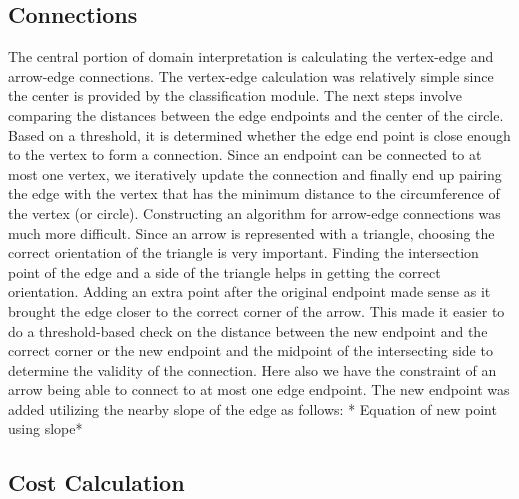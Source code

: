 \subsection{Connections}

The central portion of domain interpretation is calculating the vertex-edge and arrow-edge connections. The vertex-edge calculation was relatively simple since the center is provided by the classification module. The next steps involve comparing the distances between the edge endpoints and the center of the circle. Based on a threshold, it is determined whether the edge end point is close enough to the vertex to form a connection. Since an endpoint can be connected to at most one vertex, we iteratively update the connection and finally end up pairing the edge with the vertex that has the minimum distance to the circumference of the vertex (or circle). Constructing an algorithm for arrow-edge connections was much more difficult. Since an arrow is represented with a triangle, choosing the correct orientation of the triangle is very important. Finding the intersection point of the edge and a side of the triangle helps in getting the correct orientation. Adding an extra point after the original endpoint made sense as it brought the edge closer to the correct corner of the arrow. This made it easier to do a threshold-based check on the distance between the new endpoint and the correct corner or the new endpoint and the midpoint of the intersecting side to determine the validity of the connection. Here also we have the constraint of an arrow being able to connect to at most one edge endpoint. The new endpoint was added utilizing the nearby slope of the edge as follows: * Equation of new point using slope*

\subsection{Cost Calculation}

